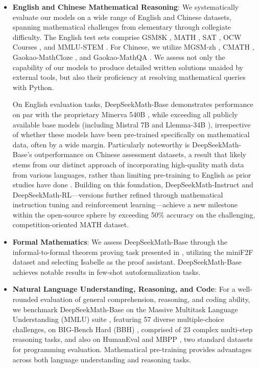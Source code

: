 \begin{itemize}[topsep=0pt]
    \item \textbf{English and Chinese Mathematical Reasoning}: We systematically evaluate our models on a wide range of English and Chinese datasets, spanning mathematical challenges from elementary through collegiate difficulty. The English test sets comprise GSM8K \citep{gsm8k}, MATH \citep{MATH}, SAT \citep{llemma}, OCW Courses \citep{minerva}, and MMLU-STEM \citep{mmlu}. For Chinese, we utilize MGSM-zh \citep{mgsm}, CMATH \citep{wei2023cmath}, Gaokao-MathCloze \citep{agieval}, and Gaokao-MathQA \citep{agieval}. We assess not only the capability of our models to produce detailed written solutions unaided by external tools, but also their proficiency at resolving mathematical queries with Python.

On English evaluation tasks, DeepSeekMath-Base demonstrates performance on par with the proprietary Minerva 540B \citep{minerva}, while exceeding all publicly available base models (including Mistral 7B \citep{mistral} and Llemma-34B \citep{llemma}), irrespective of whether these models have been pre-trained specifically on mathematical data, often by a wide margin. Particularly noteworthy is DeepSeekMath-Base’s outperformance on Chinese assessment datasets, a result that likely stems from our distinct approach of incorporating high-quality math data from various languages, rather than limiting pre-training to English as prior studies have done \citep{minerva, llemma}. Building on this foundation, DeepSeekMath-Instruct and DeepSeekMath-RL—versions further refined through mathematical instruction tuning and reinforcement learning—achieve a new milestone within the open-source sphere by exceeding 50\% accuracy on the challenging, competition-oriented MATH dataset.

\item \textbf{Formal Mathematics}: We assess DeepSeekMath-Base through the informal-to-formal theorem proving task presented in \citep{dsp_proof}, utilizing the miniF2F \citep{minif2f} dataset and selecting Isabelle \citep{isabelle} as the proof assistant. DeepSeekMath-Base achieves notable results in few-shot autoformalization tasks.
\item \textbf{Natural Language Understanding, Reasoning, and Code}: For a well-rounded evaluation of general comprehension, reasoning, and coding ability, we benchmark DeepSeekMath-Base on the Massive Multitask Language Understanding (MMLU) suite \citep{mmlu}, featuring 57 diverse multiple-choice challenges, on BIG-Bench Hard (BBH) \citep{bbh}, comprised of 23 complex multi-step reasoning tasks, and also on HumanEval \citep{codex} and MBPP \citep{mbpp}, two standard datasets for programming evaluation. Mathematical pre-training provides advantages across both language understanding and reasoning tasks.


\end{itemize}
